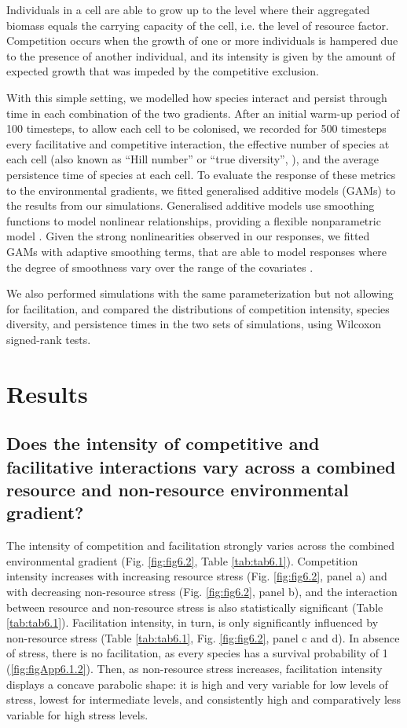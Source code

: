 Individuals in a cell are able to grow up to the level where their aggregated biomass equals the carrying capacity of the cell, i.e. the level of resource factor. Competition occurs when the growth of one or more individuals is hampered due to the presence of another individual, and its intensity is given by the amount of expected growth that was impeded by the competitive exclusion.

With this simple setting, we modelled how species interact and persist through time in each combination of the two gradients. After an initial warm-up period of 100 timesteps, to allow each cell to be colonised, we recorded for 500 timesteps every facilitative and competitive interaction, the effective number of species at each cell (also known as “Hill number” or “true diversity”, \citealt{Tuomisto2012}), and the average persistence time of species at each cell. To evaluate the response of these metrics to the environmental gradients, we fitted generalised additive models (GAMs) to the results from our simulations. Generalised additive models use smoothing functions to model nonlinear relationships, providing a flexible nonparametric model \citep{Wood2017}. Given the strong nonlinearities observed in our responses, we fitted GAMs with adaptive smoothing terms, that are able to model responses where the degree of smoothness vary over the range of the covariates \citep{Wood2017}.

We also performed simulations with the same parameterization but not allowing for facilitation, and compared the distributions of competition intensity, species diversity, and persistence times in the two sets of simulations, using Wilcoxon signed-rank tests.

\section{Results}

\subsection*{Does the intensity of competitive and facilitative interactions vary across a combined resource and non-resource environmental gradient?}

The intensity of competition and facilitation strongly varies across the combined environmental gradient (Fig. \ref{fig:fig6.2}, Table \ref{tab:tab6.1}). Competition intensity increases with increasing resource stress (Fig. \ref{fig:fig6.2}, panel a) and with decreasing non-resource stress (Fig. \ref{fig:fig6.2}, panel b), and the interaction between resource and non-resource stress is also statistically significant (Table \ref{tab:tab6.1}). Facilitation intensity, in turn, is only significantly influenced by non-resource stress (Table \ref{tab:tab6.1}, Fig. \ref{fig:fig6.2}, panel c and d). In absence of stress, there is no facilitation, as every species has a survival probability of 1 (\cref{fig:figApp6.1.2}). Then, as non-resource stress increases, facilitation intensity displays a concave parabolic shape: it is high and very variable for low levels of stress, lowest for intermediate levels, and consistently high and comparatively less variable for high stress levels.

